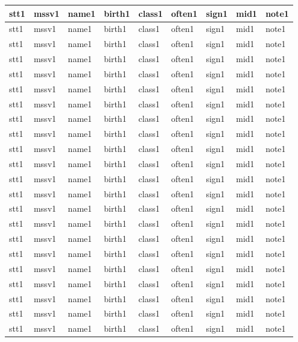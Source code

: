 \documentclass[14pt,a4paper]{article}
\begin{document}
\begin{tabular}{ m{0.7cm} | m{2cm}| m{4cm} | m{2cm} | m{2.5cm} | m{1.2cm} | m{1.5cm} | m{1cm} | m{1.6cm} | }
	\hline
	stt1 & mssv1 & name1 & birth1 & class1 & often1 & sign1 & mid1 & note1\\
	\hline
	stt1 & mssv1 & name1 & birth1 & class1 & often1 & sign1 & mid1 & note1\\
	\hline
	stt1 & mssv1 & name1 & birth1 & class1 & often1 & sign1 & mid1 & note1\\
	\hline
	stt1 & mssv1 & name1 & birth1 & class1 & often1 & sign1 & mid1 & note1\\
	\hline
	stt1 & mssv1 & name1 & birth1 & class1 & often1 & sign1 & mid1 & note1\\
	\hline
	stt1 & mssv1 & name1 & birth1 & class1 & often1 & sign1 & mid1 & note1\\
	\hline
	stt1 & mssv1 & name1 & birth1 & class1 & often1 & sign1 & mid1 & note1\\
	\hline
	stt1 & mssv1 & name1 & birth1 & class1 & often1 & sign1 & mid1 & note1\\
	\hline
	stt1 & mssv1 & name1 & birth1 & class1 & often1 & sign1 & mid1 & note1\\
	\hline
	stt1 & mssv1 & name1 & birth1 & class1 & often1 & sign1 & mid1 & note1\\
	\hline
	stt1 & mssv1 & name1 & birth1 & class1 & often1 & sign1 & mid1 & note1\\
	\hline
	stt1 & mssv1 & name1 & birth1 & class1 & often1 & sign1 & mid1 & note1\\
	\hline
	stt1 & mssv1 & name1 & birth1 & class1 & often1 & sign1 & mid1 & note1\\
	\hline
	stt1 & mssv1 & name1 & birth1 & class1 & often1 & sign1 & mid1 & note1\\
	\hline
	stt1 & mssv1 & name1 & birth1 & class1 & often1 & sign1 & mid1 & note1\\
	\hline
	stt1 & mssv1 & name1 & birth1 & class1 & often1 & sign1 & mid1 & note1\\
	\hline
	stt1 & mssv1 & name1 & birth1 & class1 & often1 & sign1 & mid1 & note1\\
	\hline
	stt1 & mssv1 & name1 & birth1 & class1 & often1 & sign1 & mid1 & note1\\
	\hline
	stt1 & mssv1 & name1 & birth1 & class1 & often1 & sign1 & mid1 & note1\\
	\hline
	stt1 & mssv1 & name1 & birth1 & class1 & often1 & sign1 & mid1 & note1\\
	\hline
	stt1 & mssv1 & name1 & birth1 & class1 & often1 & sign1 & mid1 & note1\\
	\hline
	stt1 & mssv1 & name1 & birth1 & class1 & often1 & sign1 & mid1 & note1\\

\end{tabular}
\end{document}
